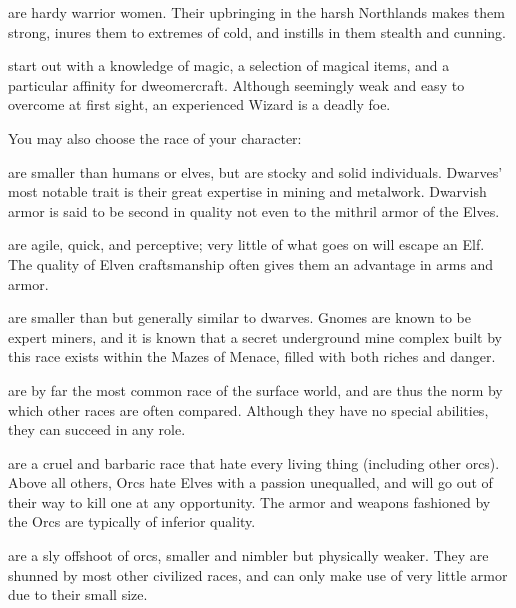 %
\item[\bb{Valkyries}]%
are hardy warrior women.  Their upbringing in the harsh
Northlands makes them strong, inures them to extremes of cold, and instills
in them stealth and cunning.

%
\item[\bb{Wizards}]%
start out with a knowledge of magic, a selection of magical
items, and a particular affinity for dweomercraft.  Although seemingly weak
and easy to overcome at first sight, an experienced Wizard is a deadly foe.
\elist

You may also choose the race of your character:

%
\blist{}
\item[\bb{Dwarves}]%
are smaller than humans or elves, but are stocky and solid
individuals.  Dwarves' most notable trait is their great expertise in mining
and metalwork.  Dwarvish armor is said to be second in quality not even to the
mithril armor of the Elves.

%
\item[\bb{Elves}]%
are agile, quick, and perceptive; very little of what goes
on will escape an Elf.  The quality of Elven craftsmanship often gives
them an advantage in arms and armor.

%
\item[\bb{Gnomes}]%
are smaller than but generally similar to dwarves.  Gnomes are
known to be expert miners, and it is known that a secret underground mine
complex built by this race exists within the Mazes of Menace, filled with
both riches and danger.

%
\item[\bb{Humans}]%
are by far the most common race of the surface world, and
are thus the norm by which other races are often compared.  Although
they have no special abilities, they can succeed in any role.

%
\item[\bb{Orcs}]%
are a cruel and barbaric race that hate every living thing
(including other orcs).  Above all others, Orcs hate Elves with a passion
unequalled, and will go out of their way to kill one at any opportunity.
The armor and weapons fashioned by the Orcs are typically of inferior quality.

%
\item[\bb{Kobolds}]%
are a sly offshoot of orcs, smaller and nimbler but physically
weaker.  They are shunned by most other civilized races, and can only make
use of very little armor due to their small size. 

